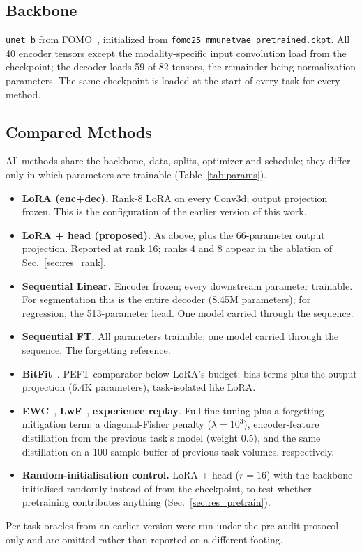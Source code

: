 \documentclass[journal,twoside,web]{ieeecolor}
\begin{document}
\subsection{Backbone}
\label{sec:backbone}

\texttt{unet\_b} from FOMO~\cite{fomo2025}, initialized from \texttt{fomo25\_mmunetvae\_pretrained.ckpt}. All 40 encoder tensors except the modality-specific input convolution load from the checkpoint; the decoder loads 59 of 82 tensors, the remainder being normalization parameters. The same checkpoint is loaded at the start of every task for every method.

\subsection{Compared Methods}
\label{sec:baselines}

All methods share the backbone, data, splits, optimizer and schedule; they differ only in which parameters are trainable (Table~\ref{tab:params}).
\begin{itemize}
\item \textbf{LoRA (enc+dec).} Rank-8 LoRA on every Conv3d; output projection frozen. This is the configuration of the earlier version of this work.
\item \textbf{LoRA + head (proposed).} As above, plus the 66-parameter output projection. Reported at rank 16; ranks 4 and 8 appear in the ablation of Sec.~\ref{sec:res_rank}.
\item \textbf{Sequential Linear.} Encoder frozen; every downstream parameter trainable. For segmentation this is the entire decoder (8.45M parameters); for regression, the 513-parameter head. One model carried through the sequence.
\item \textbf{Sequential FT.} All parameters trainable; one model carried through the sequence. The forgetting reference.
\item \textbf{BitFit}~\cite{bitfit}. PEFT comparator below LoRA's budget: bias terms plus the output projection (6.4K parameters), task-isolated like LoRA.
\item \textbf{EWC}~\cite{kirkpatrick2017}, \textbf{LwF}~\cite{li2017lwf}, \textbf{experience replay}. Full fine-tuning plus a forgetting-mitigation term: a diagonal-Fisher penalty ($\lambda=10^3$), encoder-feature distillation from the previous task's model (weight 0.5), and the same distillation on a 100-sample buffer of previous-task volumes, respectively.
\item \textbf{Random-initialisation control.} LoRA + head ($r{=}16$) with the backbone initialised randomly instead of from the checkpoint, to test whether pretraining contributes anything (Sec.~\ref{sec:res_pretrain}).
\end{itemize}
Per-task oracles from an earlier version were run under the pre-audit protocol only and are omitted rather than reported on a different footing.
\end{document}
